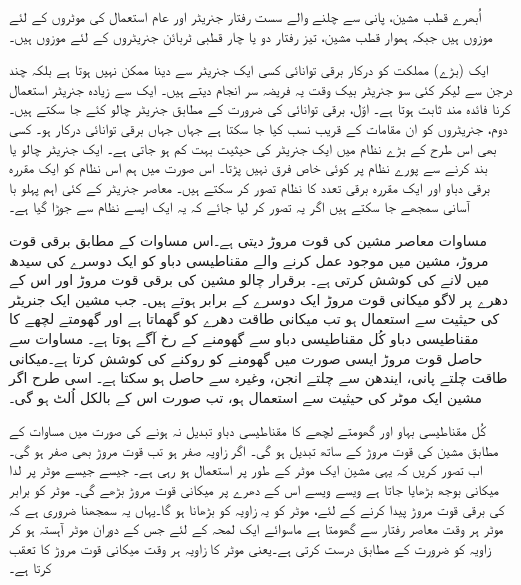 اُبھرے قطب مشین، پانی سے چلنے والے سست رفتار جنریٹر اور  عام استعمال کی موٹروں کے لئے موزوں  ہیں جبکہ ہموار قطب مشین، تیز رفتار دو یا چار قطبی ٹربائن جنریٹروں کے لئے موزوں  ہیں۔

ایک (بڑے) مملکت کو درکار برقی توانائی  کسی ایک  جنریٹر سے دینا ممکن نہیں ہوتا ہے بلکہ چند درجن سے لیکر کئی سو  جنریٹر بیک وقت یہ فریضہ سر انجام دیتے  ہیں۔ ایک سے زیادہ جنریٹر استعمال کرنا فائدہ مند ثابت ہوتا ہے۔ اوّل، برقی توانائی کی ضرورت کے مطابق جنریٹر چالو کئے جا سکتے ہیں۔ دوم،  جنریٹروں کو ان مقامات کے قریب نسب کیا جا سکتا ہے جہاں جہاں برقی توانائی درکار ہو۔ کسی بھی اس طرح کے بڑے نظام میں ایک جنریٹر کی حیثیت بہت کم ہو جاتی ہے۔ ایک جنریٹر چالو یا بند کرنے سے پورے نظام پر کوئی خاص فرق نہیں پڑتا۔ اس صورت میں ہم اس نظام کو ایک مقررہ برقی دباو اور ایک مقررہ برقی تعدد کا نظام تصور کر سکتے ہیں۔ معاصر جنریٹر کے کئی اہم پہلو با آسانی سمجھے جا سکتے ہیں اگر یہ تصور کر لیا جائے کہ یہ ایک ایسے  نظام سے جوڑا گیا ہے۔

مساوات    معاصر مشین کی قوت مروڑ دیتی ہے۔اس مساوات کے مطابق برقی قوت مروڑ، مشین میں موجود عمل کرنے والے مقناطیسی دباو کو ایک دوسرے کی سیدھ میں لانے کی کوشش کرتی ہے۔ برقرار  چالو  مشین کی  برقی قوت مروڑ اور اس کے دھرے پر لاگو میکانی قوت مروڑ ایک دوسرے کے برابر ہوتے ہیں۔ جب مشین ایک جنریٹر کی حیثیت سے استعمال ہو تب میکانی طاقت  دھرے کو گھماتا ہے اور گھومتے لچھے کا مقناطیسی دباو کُل مقناطیسی دباو سے گھومنے کے رخ  آگے ہوتا ہے۔ مساوات  سے حاصل قوت مروڑ ایسی صورت میں گھومنے کو روکنے کی کوشش کرتا ہے۔میکانی طاقت چلتے پانی، ایندھن سے چلتے انجن، وغیرہ سے حاصل ہو سکتا ہے۔ اسی طرح اگر مشین ایک موٹر کی حیثیت سے استعمال ہو، تب صورت اس کے بالکل اُلٹ ہو گی۔

کُل مقناطیسی بہاو   اور گھومتے لچھے کا مقناطیسی دباو  تبدیل نہ ہونے کی صورت میں  مساوات  کے مطابق مشین کی قوت مروڑ   کے ساتھ تبدیل ہو گی۔ اگر زاویہ  صفر ہو تب  قوت مروڑ بھی صفر ہو گی۔ اب  تصور کریں کہ یہی مشین ایک موٹر کے طور پر استعمال ہو رہی ہے۔ جیسے جیسے موٹر پر لدا میکانی بوجھ بڑھایا جاتا ہے ویسے ویسے اس کے دھرے پر میکانی قوت مروڑ بڑھے گی۔ موٹر کو برابر کی برقی قوت مروڑ پیدا کرنے کے لئے، موٹر  کو یہ  زاویہ کو بڑھانا ہو گا۔یہاں یہ سمجھنا ضروری ہے کہ موٹر ہر وقت معاصر رفتار سے گھومتا ہے ماسوائے ایک لمحہ کے لئے جس کے دوران موٹر آہستہ ہو کر زاویہ کو ضرورت کے مطابق درست کرتی ہے۔یعنی موٹر کا زاویہ  ہر وقت میکانی قوت مروڑ کا تعقب  کرتا ہے۔

